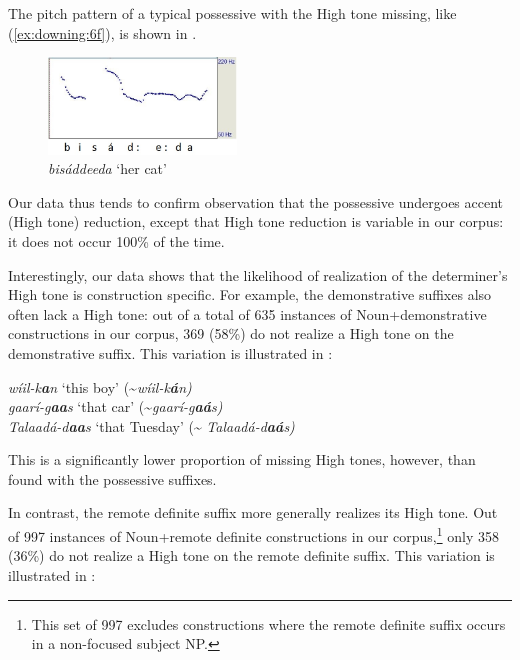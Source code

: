 \documentclass[output=paper]{langscibook}
\begin{document}
The pitch pattern of a typical possessive with the High tone missing, like (\ref{ex:downing:6f}), is shown in .

  
\begin{figure}  
\includegraphics[width=5cm]{figures/downing-img1.jpg}
\caption{ \textit{bisáddeeda} ‘her cat’}
\label{fig:downing:1}
\end{figure}



Our data thus tends to confirm  observation that the possessive undergoes accent (High tone) reduction, except that High tone reduction is variable in our corpus: it does not occur 100\% of the time.

Interestingly, our data shows that the likelihood of realization of the determiner’s High tone is construction specific. For example, the demonstrative suffixes also often lack a High tone: out of a total of 635 instances of Noun+de\-mon\-stra\-tive constructions in our corpus, 369 (58\%) do not realize a High tone on the demonstrative suffix. This variation is illustrated in :

\ea 
\label{ex:downing:7}
\ea  \textit{wíil-k}\textbf{\textit{a}}\textit{n}  ‘this boy’  (\textasciitilde\textit{wíil-k}\textbf{\textit{á}}\textit{n)}\\

\ex   \textit{gaarí-g}\textbf{\textit{aa}}\textit{s}  ‘that car’  (\textasciitilde\textit{gaarí-g}\textbf{\textit{aá}}\textit{s)}\\

\ex   \textit{Talaadá-d}\textbf{\textit{aa}}\textit{s}  ‘that Tuesday’  (\textasciitilde\textit{ Talaadá-d}\textbf{\textit{aá}}\textit{s)}\\
\z
\z

This is a significantly lower proportion of missing High tones, however, than found with the possessive suffixes.

In contrast, the remote definite suffix more generally realizes its High tone. Out of 997 instances of Noun+remote definite constructions in our corpus,\footnote{This set of 997 excludes constructions where the remote definite suffix occurs in a non-focused subject NP.} only 358 (36\%) do not realize a High tone on the remote definite suffix. This variation is illustrated in :
\end{document}
